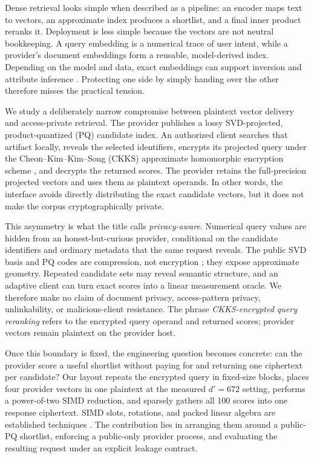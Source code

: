 \documentclass[pdflatex,sn-basic,Numbered]{sn-jnl}
\theoremstyle{plain}
\begin{document}
Dense retrieval looks simple when described as a pipeline: an encoder maps text to vectors, an approximate index produces a shortlist, and a final inner product reranks it. Deployment is less simple because the vectors are not neutral bookkeeping. A query embedding is a numerical trace of user intent, while a provider's document embeddings form a reusable, model-derived index. Depending on the model and data, exact embeddings can support inversion and attribute inference \cite{Song2020EmbeddingLeakage,Li2023GEIA,Morris2023Vec2Text}. Protecting one side by simply handing over the other therefore misses the practical tension.

We study a deliberately narrow compromise between plaintext vector delivery and access-private retrieval. The provider publishes a lossy SVD-projected, product-quantized (PQ) candidate index. An authorized client searches that artifact locally, reveals the selected identifiers, encrypts its projected query under the Cheon--Kim--Kim--Song (CKKS) approximate homomorphic encryption scheme \cite{Cheon2017CKKS}, and decrypts the returned scores. The provider retains the full-precision projected vectors and uses them as plaintext operands. In other words, the interface avoids directly distributing the exact candidate vectors, but it does not make the corpus cryptographically private.

This asymmetry is what the title calls \emph{privacy-aware}. Numerical query values are hidden from an honest-but-curious provider, conditional on the candidate identifiers and ordinary metadata that the same request reveals. The public SVD basis and PQ codes are compression, not encryption \cite{Jegou2011PQ}; they expose approximate geometry. Repeated candidate sets may reveal semantic structure, and an adaptive client can turn exact scores into a linear measurement oracle. We therefore make no claim of document privacy, access-pattern privacy, unlinkability, or malicious-client resistance. The phrase \emph{CKKS-encrypted query reranking} refers to the encrypted query operand and returned scores; provider vectors remain plaintext on the provider host.

Once this boundary is fixed, the engineering question becomes concrete: can the provider score a useful shortlist without paying for and returning one ciphertext per candidate? Our layout repeats the encrypted query in fixed-size blocks, places four provider vectors in one plaintext at the measured $d'=672$ setting, performs a power-of-two SIMD reduction, and sparsely gathers all 100 scores into one response ciphertext. SIMD slots, rotations, and packed linear algebra are established techniques \cite{Smart2014SIMD,Halevi2014HElib,Dathathri2019CHET,Dathathri2020EVA,Zhang2021GALA,Juvekar2018Gazelle}. The contribution lies in arranging them around a public-PQ shortlist, enforcing a public-only provider process, and evaluating the resulting request under an explicit leakage contract.
\end{document}
